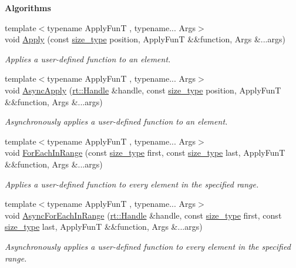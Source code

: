 \begin{Indent}{\bf Algorithms}\par
\begin{DoxyCompactItemize}
\item 
{\footnotesize template$<$typename Apply\-Fun\-T , typename... Args$>$ }\\void \hyperlink{classshad_1_1Vector_a35b98ffc99f64690a55408d847e41cb7}{Apply} (const \hyperlink{classshad_1_1Vector_a1c97f4eb87d738cb4de97e5b3587c397}{size\-\_\-type} position, Apply\-Fun\-T \&\&function, Args \&...args)
\begin{DoxyCompactList}\small\item\em Applies a user-\/defined function to an element. \end{DoxyCompactList}\item 
{\footnotesize template$<$typename Apply\-Fun\-T , typename... Args$>$ }\\void \hyperlink{classshad_1_1Vector_a6157b35194197e1cf6491bc70cf08e14}{Async\-Apply} (\hyperlink{classshad_1_1rt_1_1Handle}{rt\-::\-Handle} \&handle, const \hyperlink{classshad_1_1Vector_a1c97f4eb87d738cb4de97e5b3587c397}{size\-\_\-type} position, Apply\-Fun\-T \&\&function, Args \&...args)
\begin{DoxyCompactList}\small\item\em Asynchronously applies a user-\/defined function to an element. \end{DoxyCompactList}\item 
{\footnotesize template$<$typename Apply\-Fun\-T , typename... Args$>$ }\\void \hyperlink{classshad_1_1Vector_aea2d723d26f4ff30dfea4bd77703e475}{For\-Each\-In\-Range} (const \hyperlink{classshad_1_1Vector_a1c97f4eb87d738cb4de97e5b3587c397}{size\-\_\-type} first, const \hyperlink{classshad_1_1Vector_a1c97f4eb87d738cb4de97e5b3587c397}{size\-\_\-type} last, Apply\-Fun\-T \&\&function, Args \&...args)
\begin{DoxyCompactList}\small\item\em Applies a user-\/defined function to every element in the specified range. \end{DoxyCompactList}\item 
{\footnotesize template$<$typename Apply\-Fun\-T , typename... Args$>$ }\\void \hyperlink{classshad_1_1Vector_a8ab3e99caafbae6cf639744079b9e9cc}{Async\-For\-Each\-In\-Range} (\hyperlink{classshad_1_1rt_1_1Handle}{rt\-::\-Handle} \&handle, const \hyperlink{classshad_1_1Vector_a1c97f4eb87d738cb4de97e5b3587c397}{size\-\_\-type} first, const \hyperlink{classshad_1_1Vector_a1c97f4eb87d738cb4de97e5b3587c397}{size\-\_\-type} last, Apply\-Fun\-T \&\&function, Args \&...args)
\begin{DoxyCompactList}\small\item\em Asynchronously applies a user-\/defined function to every element in the specified range. \end{DoxyCompactList}\end{DoxyCompactItemize}
\end{Indent}
